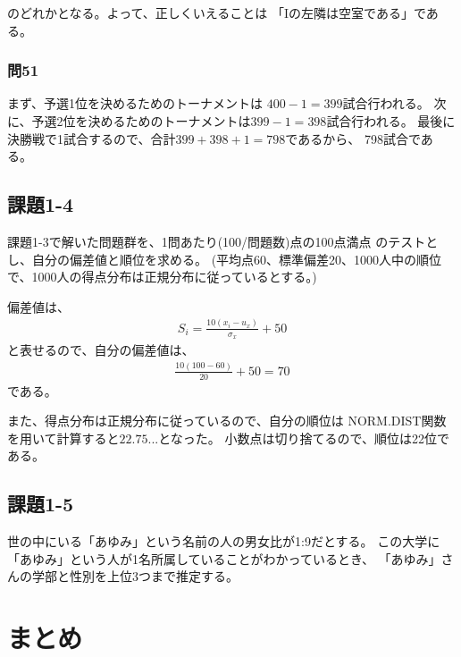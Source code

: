 \documentclass[12pt]{jarticle}
\begin{document}
のどれかとなる。よって、正しくいえることは
「Iの左隣は空室である」である。

\subsubsection*{問51}
まず、予選1位を決めるためのトーナメントは
$400-1=399$試合行われる。
次に、予選2位を決めるためのトーナメントは$399-1=398$試合行われる。
最後に決勝戦で1試合するので、合計$399+398+1=798$であるから、
798試合である。

\subsection{課題1-4}
\begin{shadebox}
    課題1-3で解いた問題群を、1問あたり(100/問題数)点の100点満点
    のテストとし、自分の偏差値と順位を求める。
    (平均点60、標準偏差20、1000人中の順位で、1000人の得点分布は正規分布に従っているとする。)
\end{shadebox}

偏差値は、
\begin{eqnarray}
    S_i=\frac{10(x_i-u_x)}{\sigma_x}+50　\nonumber
\end{eqnarray}
と表せるので、自分の偏差値は、
\begin{eqnarray}
    \frac{10(100-60)}{20}+50=70　\nonumber
\end{eqnarray}
である。

また、得点分布は正規分布に従っているので、自分の順位は
NORM.DIST関数を用いて計算すると$22.75...$となった。
小数点は切り捨てるので、順位は22位である。

\clearpage
\subsection{課題1-5}
\begin{shadebox}
    世の中にいる「あゆみ」という名前の人の男女比が1:9だとする。
    この大学に「あゆみ」という人が1名所属していることがわかっているとき、
    「あゆみ」さんの学部と性別を上位3つまで推定する。
\end{shadebox}


\section{まとめ}


\clearpage

\begin{thebibliography}{99}
    \label{sannkoubunnkenn_chapter}

\end{thebibliography}


\clearpage

\appendix

\end{document}
